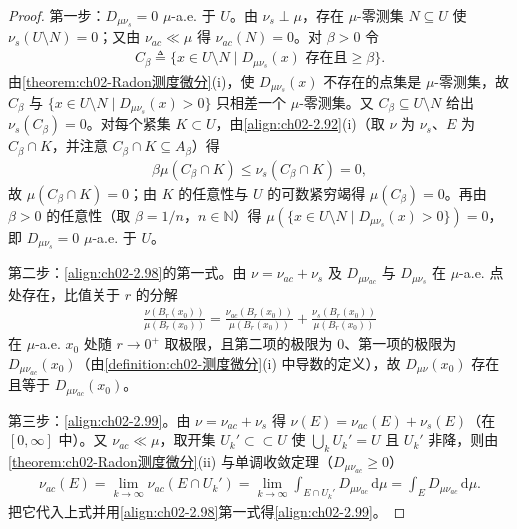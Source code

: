 \documentclass[../../main.tex]{subfiles}%
\begin{document}
\begin{proof}
第一步：$D_{\mu\nu_s}=0$ $\mu$-a.e. 于 $U$。由 $\nu_s\perp\mu$，存在 $\mu$-零测集 $N\subseteq U$ 使 $\nu_s(U\setminus N)=0$；又由 $\nu_{ac}\ll\mu$ 得 $\nu_{ac}(N)=0$。对 $\beta>0$ 令
\begin{align*}
C_\beta\triangleq\{x\in U\setminus N\mid D_{\mu\nu_s}(x)\text{ 存在且}\geqslant\beta\}.
\end{align*}
由\cref{theorem:ch02-Radon测度微分}(i)，使 $D_{\mu\nu_s}(x)$ 不存在的点集是 $\mu$-零测集，故 $C_\beta$ 与 $\{x\in U\setminus N\mid D_{\mu\nu_s}(x)>0\}$ 只相差一个 $\mu$-零测集。又 $C_\beta\subseteq U\setminus N$ 给出 $\nu_s(C_\beta)=0$。对每个紧集 $K\subset U$，由\eqref{align:ch02-2.92}(i)（取 $\nu$ 为 $\nu_s$、$E$ 为 $C_\beta\cap K$，并注意 $C_\beta\cap K\subseteq A_\beta$）得
\begin{align*}
\beta\mu(C_\beta\cap K)\leqslant\nu_s(C_\beta\cap K)=0,
\end{align*}
故 $\mu(C_\beta\cap K)=0$；由 $K$ 的任意性与 $U$ 的可数紧穷竭得 $\mu(C_\beta)=0$。再由 $\beta>0$ 的任意性（取 $\beta=1/n$，$n\in\mathbb N$）得 $\mu(\{x\in U\setminus N\mid D_{\mu\nu_s}(x)>0\})=0$，即 $D_{\mu\nu_s}=0$ $\mu$-a.e. 于 $U$。

第二步：\eqref{align:ch02-2.98}的第一式。由 $\nu=\nu_{ac}+\nu_s$ 及 $D_{\mu\nu_{ac}}$ 与 $D_{\mu\nu_s}$ 在 $\mu$-a.e. 点处存在，比值关于 $r$ 的分解
\begin{align*}
\frac{\nu(B_r(x_0))}{\mu(B_r(x_0))}=\frac{\nu_{ac}(B_r(x_0))}{\mu(B_r(x_0))}+\frac{\nu_s(B_r(x_0))}{\mu(B_r(x_0))}
\end{align*}
在 $\mu$-a.e. $x_0$ 处随 $r\to0^+$ 取极限，且第二项的极限为 $0$、第一项的极限为 $D_{\mu\nu_{ac}}(x_0)$（由\cref{definition:ch02-测度微分}(i) 中导数的定义），故 $D_{\mu\nu}(x_0)$ 存在且等于 $D_{\mu\nu_{ac}}(x_0)$。

第三步：\eqref{align:ch02-2.99}。由 $\nu=\nu_{ac}+\nu_s$ 得 $\nu(E)=\nu_{ac}(E)+\nu_s(E)$（在 $[0,\infty]$ 中）。又 $\nu_{ac}\ll\mu$，取开集 $U_k'\subset\subset U$ 使 $\bigcup_kU_k'=U$ 且 $U_k'$ 非降，则由\cref{theorem:ch02-Radon测度微分}(ii) 与单调收敛定理（$D_{\mu\nu_{ac}}\geqslant0$）
\begin{align*}
\nu_{ac}(E)=\lim_{k\to\infty}\nu_{ac}(E\cap U_k')=\lim_{k\to\infty}\int_{E\cap U_k'}D_{\mu\nu_{ac}}\,\mathrm{d}\mu=\int_ED_{\mu\nu_{ac}}\,\mathrm{d}\mu.
\end{align*}
把它代入上式并用\eqref{align:ch02-2.98}第一式得\eqref{align:ch02-2.99}。
\end{proof}
\end{document}

